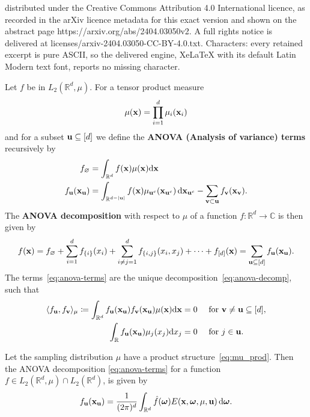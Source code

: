 \documentclass[10pt,a4paper]{amsart}
\newcommand{\C}{\ensuremath{\mathbb{C}}}
\newcommand{\R}{\ensuremath{\mathbb{R}}}
\renewcommand{\d}{\, \mathrm{d}}
\newcommand{\dx}{\mathrm{d}}
\renewcommand{\vec}[1]{\ensuremath \mathbf{\boldsymbol{#1}}}
\newcommand{\w}{\ensuremath{\vec \omega}}
\newcommand{\x}{\ensuremath{\vec x}}
\begin{document}
distributed under the Creative Commons Attribution 4.0 International licence, as recorded in the arXiv licence metadata for this exact version and shown on the abstract page https://arxiv.org/abs/2404.03050v2. A full rights notice is delivered at licenses/arxiv-2404.03050-CC-BY-4.0.txt. Characters: every retained excerpt is pure ASCII, so the delivered engine, XeLaTeX with its default Latin Modern text font, reports no missing character.
\begin{definition}\label{def:anova-terms}
Let $f$ be in $L_2(\R^d,\mu)$. For a tensor product measure 
\begin{equation}\label{eq:mu_prod}
\mu(\vec x) = \prod_{i=1}^d \mu_i(\vec x_i)
\end{equation}
and for a subset $\vec u\subseteq[d]$ we define the \textbf{ANOVA (Analysis of variance) terms} recursively by 
\begin{align}\label{eq:anova-terms}
f_{\varnothing} &= \int_{\R^d} f(\x) \mu(\x) \dx \x \notag\\
f_{\vec u}(\vec x_{\vec u}) &=\int_{\R^{d-|\vec u|}}f(\vec x) \mu_{\vec u^c}(\vec x_{\vec u^c})\d \vec x_{\vec u^c}-\sum_{\vec v\subset \vec u}f_{\vec v}(\vec x_{\vec v}).
\end{align}
The\textbf{ ANOVA decomposition} with respect to $\mu$ of a function ${f\colon \R^d\to \C}$ is then given by
\begin{equation}\label{eq:anova-decomp}
f(\vec x)=f_{\varnothing}+\sum_{i=1}^d f_{\{i\}}(x_i)+\sum_{i\neq j=1}^d f_{\{i,j\}}(x_i,x_j)+\cdots+f_{[d]}(\vec x)=\sum_{\vec u\subseteq[d]}f_{\vec u}(\vec x_{\vec u}).
\end{equation}
The terms~\eqref{eq:anova-terms} are the unique decomposition~\eqref{eq:anova-decomp}, 
such that 
\begin{align}
\langle f_{\vec u},f_{\vec v} \rangle_\mu \coloneqq \int_{\R^d} f_{\vec u}(\x_{\vec u})f_{\vec v}(\x_{\vec u})\mu(\x) \dx \x &= 0 \quad \text{ for } \vec v\neq \vec u\subseteq[d],\label{eq:orth}\\
\int_{\R} f_{\vec u}(\x_{\vec u}) \mu_j(x_j)\dx x_j &= 0 \quad \text{ for } j\in  \vec u. \label{eq:zero_mean}
\end{align}
\end{definition} 

\begin{lemma}\label{lem:ANOVA-terms_f}
Let the sampling distribution $\mu$ have a product structure~\eqref{eq:mu_prod}. Then the ANOVA decomposition \eqref{eq:anova-terms} for a function $f\in L_2(\R^d,\mu) \cap L_2(\R^d)$, is given by
\begin{equation}\label{eq:anova_hat}
f_{\vec u}(\vec x_{\vec u}) 
= \frac{1}{(2\pi)^d}\int_{\R^d} \hat f(\w)E(\x,\w,\mu, \vec u)   \d \w.
\end{equation}



\end{lemma}
\end{document}
